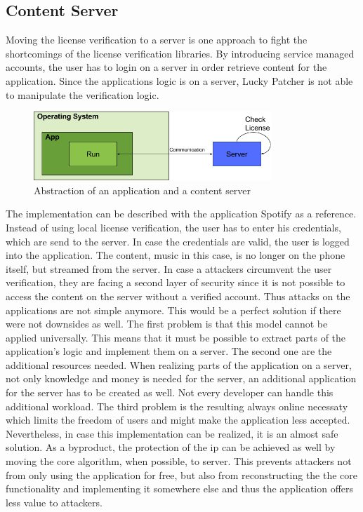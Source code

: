 \subsection{Content Server} \label{section:counter-replace-server}
Moving the license verification to a server is one approach to fight the shortcomings of the license verification libraries.
By introducing service managed accounts, the user has to login on a server in order retrieve content for the application.
Since the applications logic is on a server, Lucky Patcher is not able to manipulate the verification logic.
\begin{figure}[h]
    \centering
    \includegraphics[width=0.8\textwidth]{data/contentServer.png}
    \caption{Abstraction of an application and a content server}
    \label{fig:contentServer}
\end{figure}
The implementation can be described with the application Spotify \cite{spotify} as a reference.
Instead of using local license verification, the user has to enter his credentials, which are send to the server.
In case the credentials are valid, the user is logged into the application.
The content, music in this case, is no longer on the phone itself, but streamed from the server.
In case a attackers circumvent the user verification, they are facing a second layer of security since it is not possible to access the content on the server without a verified account.
Thus attacks on the applications are not simple anymore.
\newline
This would be a perfect solution if there were not downsides as well.
The first problem is that this model cannot be applied universally.
This means that it must be possible to extract parts of the application's logic and implement them on a server.
The second one are the additional resources needed.
When realizing parts of the application on a server, not only knowledge and money is needed for the server, an additional application for the server has to be created as well.
Not every developer can handle this additional workload.
The third problem is the resulting always online necessaty which limits the freedom of users and might make the application less accepted.
\newline
Nevertheless, in case this implementation can be realized, it is an almost safe solution.
As a byproduct, the protection of the \gls{ip} can be achieved as well by moving the core algorithm, when possible, to server.
This prevents attackers not from only using the application for free, but also from reconstructing the the core functionality and implementing it somewhere else and thus the application offers less value to attackers.

